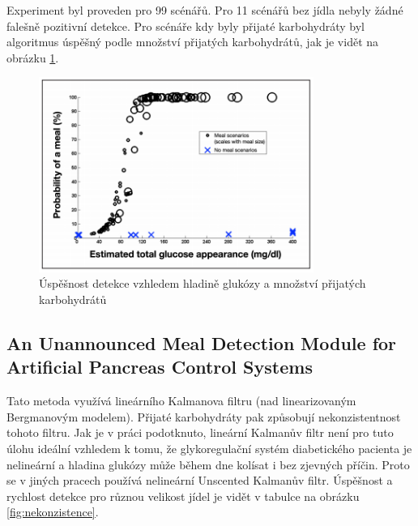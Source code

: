 Experiment byl proveden pro 99 scénářů. Pro 11 scénářů bez jídla nebyly žádné falešně pozitivní detekce. Pro scénáře kdy byly přijaté karbohydráty byl algoritmus úspěšný podle množství přijatých karbohydrátů, jak je vidět na obrázku \ref{fig:diff2}.

\begin{figure}[H]
\caption{Úspěšnost detekce vzhledem hladině glukózy a množství přijatých karbohydrátů}
\label{fig:diff2}
\includegraphics[width=0.8\textwidth]{img/analyza/diff2.png}
\end{figure}


\subsection{An Unannounced Meal Detection Module for Artificial Pancreas Control Systems \citep{Analyza.Nekonzistence}}
\label{ch:nekonzistence}

Tato metoda využívá lineárního Kalmanova filtru (nad linearizovaným Bergmanovým modelem). Přijaté karbohydráty pak způsobují nekonzistentnost tohoto filtru. Jak je v práci podotknuto, lineární Kalmanův filtr není pro tuto úlohu ideální vzhledem k tomu, že glykoregulační systém diabetického pacienta je nelineární a hladina glukózy může během dne kolísat i bez zjevných příčin. Proto se v jiných pracech používá nelineární Unscented Kalmanův filtr. Úspěšnost a rychlost detekce pro různou velikost jídel je vidět v tabulce na obrázku \ref{fig:nekonzistence}.

